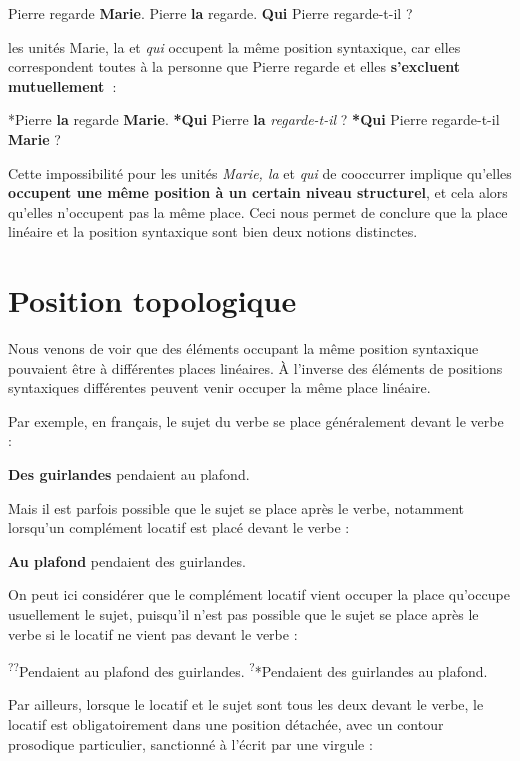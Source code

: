 \ea
{Pierre regarde} \textbf{{Marie}}.
\z
\ea
{Pierre} \textbf{{la}}  {regarde.}
\z
\ea
\textbf{{Qui}}  {Pierre regarde-t-il} ?
\z

les unités  {Marie, la} et \textit{qui} occupent la même position syntaxique, car elles correspondent toutes à la personne que Pierre regarde et elles \textbf{s’excluent} \textbf{mutuellement~}:

\ea
*{Pierre} \textbf{{la}}  {regarde} \textbf{{Marie}}.
\z
\ea
\textbf{*{Qui}}  {Pierre} \textbf{{la}} \textit{regarde-t-il} ?
\z
\ea
\textbf{*{Qui}}  {Pierre regarde-t-il} \textbf{{Marie}} ?
\z

Cette impossibilité pour les unités \textit{Marie, la} et \textit{qui} de cooccurrer implique qu’elles \textbf{occupent une même position à un certain niveau structurel}, et cela alors qu’elles n’occupent pas la même place. Ceci nous permet de conclure que la place linéaire et la position syntaxique sont bien deux notions distinctes.

\section{Position topologique}\label{sec:3.5.4}

Nous venons de voir que des éléments occupant la même position syntaxique pouvaient être à différentes places linéaires. À l’inverse des éléments de positions syntaxiques différentes peuvent venir occuper la même place linéaire.

Par exemple, en français, le sujet du verbe se place généralement devant le verbe :

\ea
\textbf{{Des guirlandes}}  {pendaient au plafond}.
\z

Mais il est parfois possible que le sujet se place après le verbe, notamment lorsqu’un complément locatif est placé devant le verbe :

\ea
\textbf{{Au plafond}}  {pendaient des guirlandes}.
\z

On peut ici considérer que le complément locatif vient occuper la place qu’occupe usuellement le sujet, puisqu’il n’est pas possible que le sujet se place après le verbe si le locatif ne vient pas devant le verbe :

\ea
\textsuperscript{??}{Pendaient au plafond des guirlandes}.
\z
\ea
\textsuperscript{?}*{Pendaient des guirlandes au plafond}.
\z

Par ailleurs, lorsque le locatif et le sujet sont tous les deux devant le verbe, le locatif est obligatoirement dans une position détachée, avec un contour prosodique particulier, sanctionné à l’écrit par une virgule :


